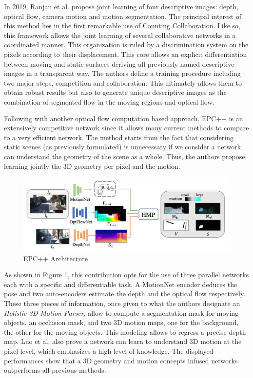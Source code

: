 In 2019, Ranjan et al. \cite{ranjan2019competitive} propose joint learning of four descriptive images: depth, optical flow, camera motion and motion segmentation. The principal interest of this method lies in the first remarkable use of Counting Collaboration. Like so, this framework allows the joint learning of several collaborative networks in a coordinated manner. This organization is ruled by a discrimination system on the pixels according to their displacement. This core allows an explicit differentiation between moving and static surfaces deriving all previously named descriptive images in a transparent way. The authors define a training procedure including two major steps, competition and collaboration. This ultimately allows them to obtain robust results but also to generate unique descriptive images as the combination of segmented flow in the moving regions and optical flow. 


Following with another optical flow computation based approach, EPC++ \cite{luo2019every} is an extensively competitive network since it allows many current methods to compare to a very efficient network. The method starts from the fact that considering static scenes (as previously formulated) is unnecessary if we consider a network can understand the geometry of the scene as a whole. Thus, the authors propose learning jointly the 3D geometry per pixel and the motion. 

\begin{figure}[h]
	\centering
	\includegraphics[width=0.8\linewidth]{Figures/SOA/illuepc++}
	\caption[EPC++ Architecture.]{EPC++ Architecture \cite{luo2019every}.}
	\label{illuepc}
\end{figure}


As shown in Figure \ref{illuepc}, this contribution opts for the use of three parallel networks each with a specific and differentiable task. A MotionNet encoder deduces the pose and two auto-encoders estimate the depth and the optical flow respectively. These three pieces of information, once given to what the authors designate an \emph{Holistic 3D Motion Parser}, allow to compute a segmentation mask for moving objects, an occlusion mask, and two 3D motion maps, one for the background, the other for the moving objects. This modeling allows to regress a precise depth map. Luo et al. also prove a network can learn to understand 3D motion at the pixel level, which emphasizes a high level of knowledge. The displayed performances show that a 3D geometry and motion concepts infused networks outperforms all previous methods.


